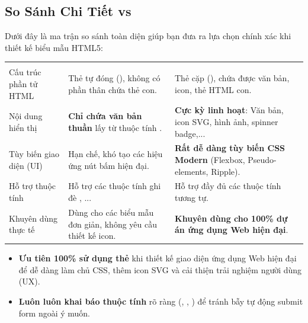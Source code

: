 \subsection{So Sánh Chi Tiết  vs }

Dưới đây là ma trận so sánh toàn diện giúp bạn đưa ra lựa chọn chính xác khi thiết kế biểu mẫu HTML5:

\begin{prettyTableBox}[Ma Trận So Sánh \codeinline{<input type="submit">} vs \codeinline{<button type="submit">}]
\begin{tabularx}{\linewidth}{K{3.0cm} Z Z}
 &  &  \\
Cấu trúc phần tử HTML & Thẻ tự đóng (), không có phần thân chứa thẻ con. & Thẻ cặp (), chứa được văn bản, icon, thẻ HTML con. \\
Nội dung hiển thị & \textbf{Chỉ chứa văn bản thuần} lấy từ thuộc tính . & \textbf{Cực kỳ linh hoạt}: Văn bản, icon SVG, hình ảnh, spinner badge,... \\
Tùy biến giao diện (UI) & Hạn chế, khó tạo các hiệu ứng nút bấm hiện đại. & \textbf{Rất dễ dàng tùy biến CSS Modern} (Flexbox, Pseudo-elements, Ripple). \\
Hỗ trợ thuộc tính & Hỗ trợ các thuộc tính ghi đè , ... & Hỗ trợ đầy đủ các thuộc tính tương tự. \\
Khuyên dùng thực tế & Dùng cho các biểu mẫu đơn giản, không yêu cầu thiết kế icon. & \textbf{Khuyên dùng cho 100\% dự án ứng dụng Web hiện đại}. \\
\end{tabularx}
\end{prettyTableBox}

\begin{conceptBox}
\begin{itemize}[leftmargin=1.5em, itemsep=3pt, parsep=0pt]
    \item \textbf{Ưu tiên 100\% sử dụng thẻ } khi thiết kế giao diện ứng dụng Web hiện đại để dễ dàng làm chủ CSS, thêm icon SVG và cải thiện trải nghiệm người dùng (UX).
    \item \textbf{Luôn luôn khai báo thuộc tính } rõ ràng (, , ) để tránh bẫy tự động submit form ngoài ý muốn.
\end{itemize}
\end{conceptBox}

